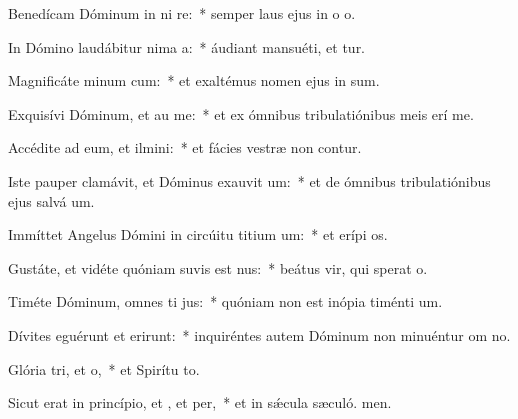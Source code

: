\item Benedícam Dóminum in ni re:~* semper laus ejus in o o.
\item In Dómino laudábitur nima a:~* áudiant mansuéti, et tur.
\item Magnificáte minum cum:~* et exaltémus nomen ejus in sum.
\item Exquisívi Dóminum, et au me:~* et ex ómnibus tribulatiónibus meis erí me.
\item Accédite ad eum, et ilmini:~* et fácies vestræ non contur.
\item Iste pauper clamávit, et Dóminus exauvit um:~* et de ómnibus tribulatiónibus ejus salvá um.
\item Immíttet Angelus Dómini in circúitu titium um:~* et erípi os.
\item Gustáte, et vidéte quóniam suvis est nus:~* beátus vir, qui sperat  o.
\item Timéte Dóminum, omnes ti jus:~* quóniam non est inópia timénti um.
\item Dívites eguérunt et erirunt:~* inquiréntes autem Dóminum non minuéntur om no.
\item Glória tri, et o,~* et Spirítu to.
\item Sicut erat in princípio, et , et per,~* et in sǽcula sæculó. men.
